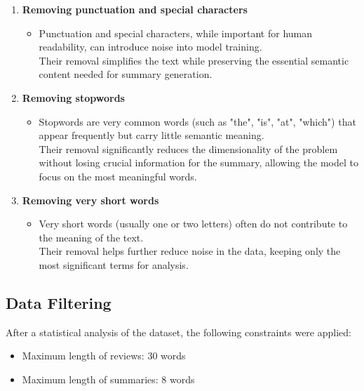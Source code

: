 \begin{enumerate}
    \item \textbf{Removing punctuation and special characters}
    \begin{itemize}
        \item Punctuation and special characters, while important for human readability, can introduce noise into model training.\\
        Their removal simplifies the text while preserving the essential semantic content needed for summary generation.
    \end{itemize}

    \item \textbf{Removing stopwords}
    \begin{itemize}
        \item Stopwords are very common words (such as "the", "is", "at", "which") that appear frequently but carry little semantic meaning.\\
        Their removal significantly reduces the dimensionality of the problem without losing crucial information for the summary, allowing the model to focus on the most meaningful words.
    \end{itemize}

    \item \textbf{Removing very short words}
    \begin{itemize}
        \item Very short words (usually one or two letters) often do not contribute to the meaning of the text.\\
        Their removal helps further reduce noise in the data, keeping only the most significant terms for analysis.
    \end{itemize}
\end{enumerate}

\subsection{Data Filtering}
After a statistical analysis of the dataset, the following constraints were applied:
\begin{itemize}
    \item Maximum length of reviews: 30 words
    \item Maximum length of summaries: 8 words
\end{itemize}

